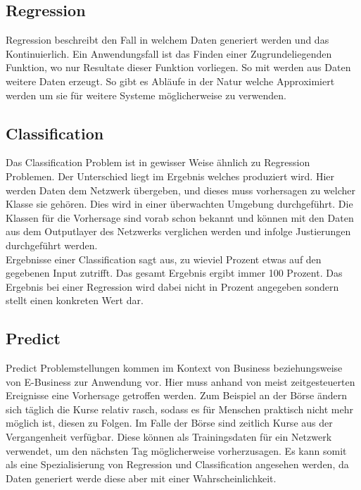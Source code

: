 \subsection{Regression}
\label{subsec:Regression}

Regression beschreibt den Fall in welchem Daten generiert werden und das Kontinuierlich.
Ein Anwendungsfall ist das Finden einer Zugrundeliegenden Funktion, wo nur Resultate dieser Funktion vorliegen. 
So mit werden aus Daten weitere Daten erzeugt.
So gibt es Abläufe in der Natur welche Approximiert werden um sie für weitere Systeme möglicherweise zu verwenden. \cite{bishop2006pattern}

\subsection{Classification}
\label{subsec:Classification}

Das Classification Problem ist in gewisser Weise ähnlich zu Regression Problemen. 
Der Unterschied liegt im Ergebnis welches produziert wird.  
Hier werden Daten dem Netzwerk übergeben, und dieses muss vorhersagen zu welcher Klasse sie gehören. Dies wird in einer überwachten Umgebung durchgeführt. 
Die Klassen für die Vorhersage sind vorab schon bekannt und können mit den Daten aus dem Outputlayer des Netzwerks verglichen werden und infolge Justierungen durchgeführt werden. \cite{AI3} \\

\noindent
Ergebnisse einer Classification sagt aus, zu wieviel Prozent etwas auf den gegebenen Input zutrifft. 
Das gesamt Ergebnis ergibt immer 100 Prozent. 
Das Ergebnis bei einer Regression wird dabei nicht in Prozent angegeben sondern stellt einen konkreten Wert dar.

\subsection{Predict}
\label{subsec:Predict}

Predict Problemstellungen kommen im Kontext von Business beziehungsweise von E-Business zur Anwendung vor. 
Hier muss anhand von meist zeitgesteuerten Ereignisse eine Vorhersage getroffen werden. 
Zum Beispiel an der Börse ändern sich täglich die Kurse relativ rasch, sodass es für Menschen praktisch nicht mehr möglich ist, diesen zu Folgen. 
Im Falle der Börse sind zeitlich Kurse aus der Vergangenheit verfügbar. 
Diese können als Trainingsdaten für ein Netzwerk verwendet, um den nächsten Tag möglicherweise vorherzusagen. 
Es kann somit als eine Spezialisierung von Regression und Classification angesehen werden, da Daten generiert werde diese aber mit einer Wahrscheinlichkeit.

